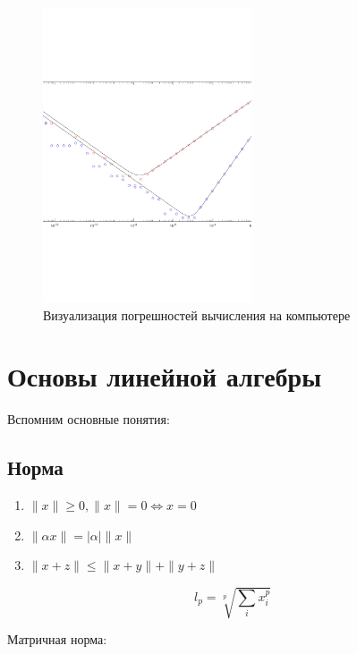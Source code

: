 \documentclass[10pt,a4paper]{article}
\begin{document}
		\begin{figure}[h!]
			\centering
			\includegraphics[width = 0.55\textwidth]{Sem_2_fig_1}
			\caption{Визуализация погрешностей вычисления на компьютере}
			\label{fig:fig_1}
		\end{figure}
	
	\section{Основы линейной алгебры}
	
		Вспомним основные понятия:
		
		\subsection{Норма}
		
			\begin{enumerate}
				\item $\parallel x\parallel \geq 0, \parallel x \parallel = 0 \Leftrightarrow x = 0$
				\item $\parallel \alpha x \parallel = \left|\alpha\right| \parallel x\parallel$
				\item $\parallel x + z \parallel \leq \parallel x+ y \parallel + \parallel y + z\parallel$
			\end{enumerate}
			
			\begin{equation}
				l_{p} = \sqrt[p]{\sum\limits_{i} x_{i}^{p}}
			\end{equation}
			
			Матричная норма:
			
\end{document}
